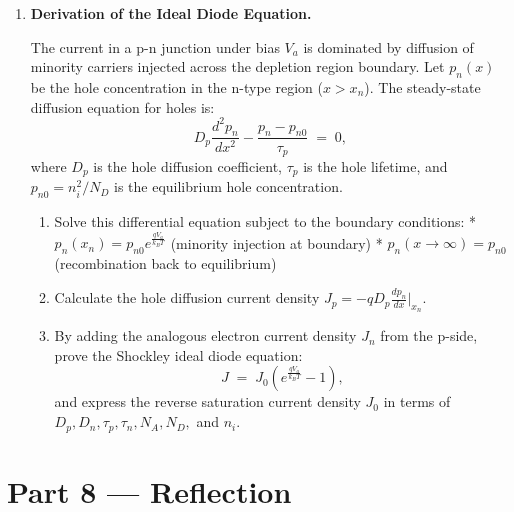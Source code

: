 \documentclass[12pt, a4paper]{book}
\begin{document}
\begin{deepbox}
\begin{enumerate}[label=\textbf{D\arabic*.}]
  \item \textbf{Derivation of the Ideal Diode Equation.}
  
        The current in a p-n junction under bias $V_a$ is dominated by diffusion of minority carriers injected across the depletion region boundary.
        Let $p_n(x)$ be the hole concentration in the n-type region ($x > x_n$). The steady-state diffusion equation for holes is:
        \[
          D_p \frac{d^2 p_n}{dx^2} - \frac{p_n - p_{n0}}{\tau_p} \;=\; 0,
        \]
        where $D_p$ is the hole diffusion coefficient, $\tau_p$ is the hole lifetime, and $p_{n0} = n_i^2/N_D$ is the equilibrium hole concentration.
        \begin{enumerate}[label=(\alph*)]
          \item Solve this differential equation subject to the boundary conditions:
                * $p_n(x_n) = p_{n0} e^{\frac{q V_a}{k_B T}}$ (minority injection at boundary)
                * $p_n(x \to \infty) = p_{n0}$ (recombination back to equilibrium)
          \item Calculate the hole diffusion current density $J_p = -q D_p \frac{dp_n}{dx}\Big|_{x_n}$.
          \item By adding the analogous electron current density $J_n$ from the p-side, prove the Shockley ideal diode equation:
                \[
                  J \;=\; J_0 \left(e^{\frac{q V_a}{k_B T}} - 1\right),
                \]
                and express the reverse saturation current density $J_0$ in terms of $D_p, D_n, \tau_p, \tau_n, N_A, N_D,$ and $n_i$.
        \end{enumerate}
\end{enumerate}
\end{deepbox}

\newpage

\section{Part 8 --- Reflection}
\end{document}
